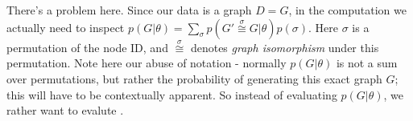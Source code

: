 There's a problem here. Since our data is a graph $D=G$, in the computation we actually need to inspect $p(G | \theta) = \sum_{\sigma} p(G' \stackrel{\sigma}{\cong} G | \theta) p(\sigma)$. Here $\sigma$ is a permutation of the node ID, and $\stackrel{\sigma}{\cong}$ denotes \textit{graph isomorphism} under this permutation. Note here our abuse of notation - normally $p(G | \theta)$ is not a sum over permutations, but rather the probability of generating this exact graph $G$; this will have to be contextually apparent. So instead of evaluating $p(G | \theta)$, we rather want to evalute .




  
  


